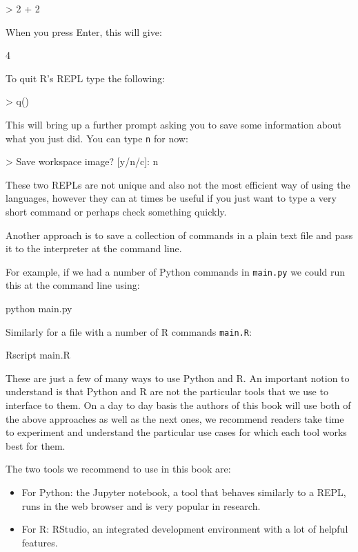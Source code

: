 \begin{Rin-no-test}
> 2 + 2
\end{Rin-no-test}

When you press Enter, this will give:

\begin{Rout-no-test}
4
\end{Rout-no-test}

To quit R's REPL type the following:

\begin{Rin-no-test}
> q()
\end{Rin-no-test}

This will bring up a further prompt asking you to save some information about
what you just did. You can type \texttt{n} for now:

\begin{Rin-no-test}
> Save workspace image? [y/n/c]: n
\end{Rin-no-test}

These two REPLs are not unique and also not the most efficient way of using the
languages, however they can at times be useful if you just want to type a very
short command or perhaps check something quickly.

Another approach is to save a collection of commands in a plain text file and
pass it to the interpreter at the command line.

For example, if we had a number of Python commands in \texttt{main.py}
we could run this at the command line using:

\begin{cliin}
python main.py
\end{cliin}

Similarly for a file with a number of R commands \texttt{main.R}:

\begin{cliin}
Rscript main.R
\end{cliin}

These are just a few of many ways to use Python and R. An important notion to
understand is that Python and R are not the particular tools that we use to
interface to them. On a day to day basis the authors of this book will use both
of the above approaches as well as the next ones, we recommend readers take time
to experiment and understand the particular use cases for which each tool works
best for them.

The two tools we recommend to use in this book are:

\begin{itemize}
    \item For Python: the Jupyter notebook, a tool that behaves similarly to a
        REPL, runs in the web browser and is very popular in research.
    \item For R: RStudio, an integrated development environment with a lot of
        helpful features.
\end{itemize}

